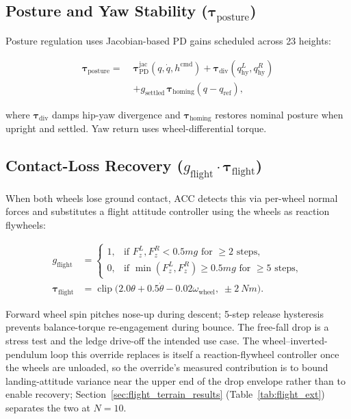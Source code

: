 \documentclass[a4paper,fleqn]{cas-dc}
\begin{document}
\subsection{Posture and Yaw Stability ($\boldsymbol{\tau}_{\text{posture}}$)}
\label{sec:posture}

Posture regulation uses Jacobian-based PD gains scheduled across 23 heights:

\begin{equation}
\begin{split}
\boldsymbol{\tau}_{\text{posture}} =\;&
\boldsymbol{\tau}_{\text{PD}}^{\text{jac}}(q,\dot{q},h^{\text{cmd}})
+ \boldsymbol{\tau}_{\text{div}}(q_{\text{hy}}^L,q_{\text{hy}}^R)\\
&+ g_{\text{settled}}\,\boldsymbol{\tau}_{\text{homing}}(q-q_{\text{ref}}),
\end{split}
\label{eq:posture}
\end{equation}

where $\boldsymbol{\tau}_{\text{div}}$ damps hip-yaw divergence and $\boldsymbol{\tau}_{\text{homing}}$ restores nominal posture when upright and settled.
Yaw return uses wheel-differential torque.

\subsection{Contact-Loss Recovery ($g_{\text{flight}}\!\cdot\!\boldsymbol{\tau}_{\text{flight}}$)}
\label{sec:flight}

When both wheels lose ground contact, ACC detects this via per-wheel normal forces and substitutes a flight attitude controller using the wheels as reaction flywheels:

\begin{align}
g_{\text{flight}} &= \begin{cases}
1, & \text{if } F_z^L, F_z^R < 0.5mg \text{ for } {\geq} 2 \text{ steps},\\
0, & \text{if } \min(F_z^L,F_z^R) \geq 0.5mg \text{ for } {\geq} 5 \text{ steps},
\end{cases}\\[2pt]
\boldsymbol{\tau}_{\text{flight}} &= \operatorname{clip}\!\big(2.0\theta + 0.5\dot{\theta} - 0.02\omega_{\text{wheel}},\;\pm\SI{2}{Nm}\big).
\label{eq:flight}
\end{align}

Forward wheel spin pitches nose-up during descent; \num{5}-step release
hysteresis prevents balance-torque re-engagement during bounce. The free-fall
drop is a stress test and the ledge drive-off the intended use case. The
wheel--inverted-pendulum loop this override replaces is itself a
reaction-flywheel controller once the wheels are unloaded, so the override's
measured contribution is to bound landing-attitude variance near the upper end
of the drop envelope rather than to enable recovery; Section~\ref{sec:flight_terrain_results}
(Table~\ref{tab:flight_ext}) separates the two at $N{=}10$.
\end{document}
